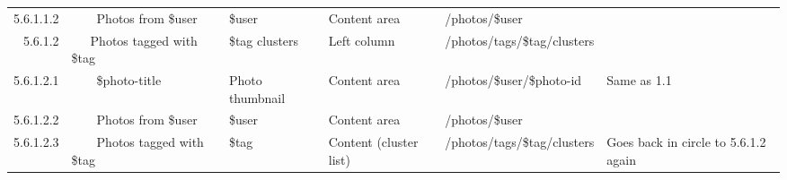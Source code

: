 \documentclass[12pt,a4paper]{article}
\begin{document}
\begin{landscape}
\begin{table}[h!b!p!]
\begin{center}
\begin{tiny}
\begin{tabular}{r|l|l|l|l|p{3cm}}
                    5.6.1.1.2 &
                    ~~~~Photos from \$user &
                    \$user &
                    Content area &
                    /photos/\$user &
                    \\

                  5.6.1.2 &
                  ~~~Photos tagged with \$tag &
                  \$tag clusters &
                  Left column &
                  /photos/tags/\$tag/clusters &
                  \\

                    5.6.1.2.1 &
                    ~~~~\$photo-title &
                    Photo thumbnail &
                    Content area &
                    /photos/\$user/\$photo-id &
                    Same as 1.1 \\

                    5.6.1.2.2 &
                    ~~~~Photos from \$user &
                    \$user &
                    Content area &
                    /photos/\$user &
                    \\

                    5.6.1.2.3 &
                    ~~~~Photos tagged with \$tag &
                    \$tag &
                    Content (cluster list) &
                    /photos/tags/\$tag/clusters &
                    Goes back in circle to 5.6.1.2 again \\

          \end{tabular}
        \rm
      \end{tiny}
    \end{center}
  \end{table}
\end{landscape}
\end{document}

